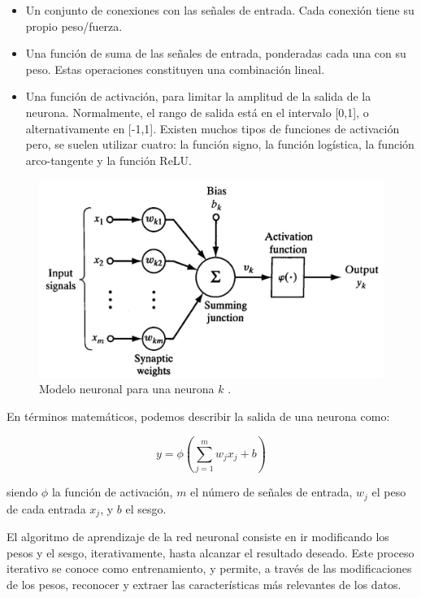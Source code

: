 \begin{itemize}
	\item Un conjunto de conexiones con las señales de entrada. Cada conexión tiene su propio peso/fuerza.
	\item Una función de suma de las señales de entrada, ponderadas cada una con su peso. Estas operaciones constituyen una combinación lineal.
	\item Una función de activación, para limitar la amplitud de la salida de la neurona. Normalmente, el rango de salida está en el intervalo [0,1], o alternativamente en [-1,1]. Existen muchos tipos de funciones de activación pero, se suelen utilizar cuatro: la función signo, la función logística, la función arco-tangente y la función ReLU.
\end{itemize} 

\begin{figure}[h]
	\centering
	\includegraphics[scale=0.25]{imagenes/cap2/neuron-model.png}
	\caption{Modelo neuronal para una neurona $k$ \cite{25}.}
	\label{fig4}
\end{figure}

En términos matemáticos, podemos describir la salida de una neurona como:

\begin{equation}
	y = \phi(\sum_{j=1}^{m} w_j x_j + b)
\end{equation}

siendo $\phi$ la función de activación, $m$ el número de señales de entrada, $w_j$ el peso de cada entrada $x_j$, y $b$ el sesgo.

El algoritmo de aprendizaje de la red neuronal consiste en ir modificando los pesos y el sesgo, iterativamente, hasta alcanzar el resultado deseado. Este proceso iterativo se conoce como entrenamiento, y permite, a través de las modificaciones de los pesos, reconocer y extraer las características más relevantes de los datos.

